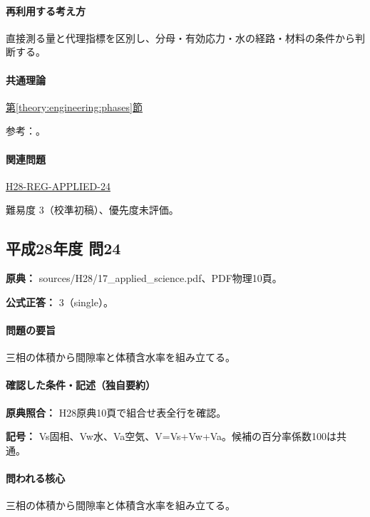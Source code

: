 \paragraph{再利用する考え方} 直接測る量と代理指標を区別し、分母・有効応力・水の経路・材料の条件から判断する。

\paragraph{共通理論} \hyperref[theory:engineering:phases]{第\ref*{theory:engineering:phases}節}

\par 参考：\cite{eng52_soil_phases}。

\paragraph{関連問題} \hyperref[q:h28-reg-applied-24]{H28-REG-APPLIED-24}

\par 難易度 3（校準初稿）、優先度未評価。

\subsection{平成28年度 問24}
\label{q:h28-reg-applied-24}

\noindent\textbf{原典：} sources/H28/17\_applied\_science.pdf、PDF物理10頁。

\textbf{公式正答：} 3（single）。

\paragraph{問題の要旨} 三相の体積から間隙率と体積含水率を組み立てる。

\paragraph{確認した条件・記述（独自要約）}\mbox{}\par

\noindent\textbf{原典照合：} H28原典10頁で組合せ表全行を確認。\par

\noindent\textbf{記号：} Vs固相、Vw水、Va空気、V=\allowbreak{}Vs+Vw+Va。候補の百分率係数100は共通。\par

\paragraph{問われる核心} 三相の体積から間隙率と体積含水率を組み立てる。

